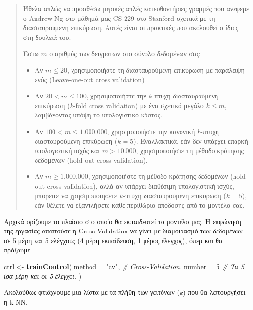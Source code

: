 \documentclass[
]{article}
\newenvironment{Shaded}{\begin{snugshade}}{\end{snugshade}}
\newcommand{\AttributeTok}[1]{\textcolor[rgb]{0.13,0.29,0.53}{#1}}
\newcommand{\CommentTok}[1]{\textcolor[rgb]{0.56,0.35,0.01}{\textit{#1}}}
\newcommand{\DecValTok}[1]{\textcolor[rgb]{0.00,0.00,0.81}{#1}}
\newcommand{\FunctionTok}[1]{\textcolor[rgb]{0.13,0.29,0.53}{\textbf{#1}}}
\newcommand{\NormalTok}[1]{#1}
\newcommand{\OtherTok}[1]{\textcolor[rgb]{0.56,0.35,0.01}{#1}}
\newcommand{\StringTok}[1]{\textcolor[rgb]{0.31,0.60,0.02}{#1}}
\begin{document}
\begin{quote}
Ήθελα απλώς να προσθέσω μερικές απλές κατευθυντήριες γραμμές που ανέφερε
ο Andrew Ng στο μάθημά μας CS 229 στο Stanford σχετικά με τη
διασταυρούμενη επικύρωση. Αυτές είναι οι πρακτικές που ακολουθεί ο ίδιος
στη δουλειά του.

Έστω \(m\) ο αριθμός των δειγμάτων στο σύνολο δεδομένων σας:

\begin{itemize}
\item
  Αν \(m \leq 20\), χρησιμοποιήστε τη διασταυρούμενη επικύρωση με
  παράλειψη ενός (Leave-one-out cross validation).
\item
  Αν \(20 < m \leq 100\), χρησιμοποιήστε την \(k\)-πτυχη διασταυρούμενη
  επικύρωση (\(k\)-fold cross validation) με ένα σχετικά μεγάλο
  \(k \leq m\), λαμβάνοντας υπόψη το υπολογιστικό κόστος.
\item
  Αν \(100 < m \leq 1.000.000\), χρησιμοποιήστε την κανονική \(k\)-πτυχη
  διασταυρούμενη επικύρωση (\(k=5\)). Εναλλακτικά, εάν δεν υπάρχει
  επαρκή υπολογιστική ισχύς και \(m > 10.000\), χρησιμοποιήστε τη μέθοδο
  κράτησης δεδομένων (hold-out cross validation).
\item
  Αν \(m \geq 1.000.000\), χρησιμοποιήστε τη μέθοδο κράτησης δεδομένων
  (hold-out cross validation), αλλά αν υπάρχει διαθέσιμη υπολογιστική
  ισχύς, μπορείτε να χρησιμοποιήσετε \(k\)-πτυχη διασταυρούμενη
  επικύρωση (\(k=5\)), εάν θέλετε να εξαντλήσετε κάθε περιθώριο απόδοσης
  από το μοντέλο σας.
\end{itemize}
\end{quote}

Αρχικά ορίζουμε το πλαίσιο στο οποίο θα εκπαιδευτεί το μοντέλο μας. Η
εκφώνηση της εργασίας απαιτούσε η Cross-Validation να γίνει με
διαμοιρασμό των δεδομένων σε 5 μέρη και 5 ελέγχους (4 μέρη εκπαίδευση, 1
μέρος έλεγχος), όπερ και θα πράξουμε.

\begin{Shaded}
\begin{Highlighting}[]
\NormalTok{ctrl }\OtherTok{\textless{}{-}} \FunctionTok{trainControl}\NormalTok{(}
  \AttributeTok{method =} \StringTok{"cv"}\NormalTok{, }\CommentTok{\# Cross{-}Validation.}
  \AttributeTok{number =} \DecValTok{5}     \CommentTok{\# Τα 5 ίσα μέρη και οι 5 έλεγχοι. }
\NormalTok{)}
\end{Highlighting}
\end{Shaded}

Ακολούθως φτιάχνουμε μια λίστα με τα πλήθη των γειτόνων (\(k\)) που θα
λειτουργήσει η k-NN.
\end{document}
